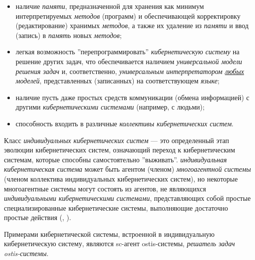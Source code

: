 \begin{itemize}
    \item наличие \textit{памяти}, предназначенной для хранения как минимум интерпретируемых \textit{методов}	(программ)  и обеспечивающей корректировку (редактирование) хранимых \textit{методов}, а также их удаление из	\textit{памяти} и ввод (запись) в \textit{память} новых \textit{методов};
    \item легкая возможность ''перепрограммировать''{} \textit{кибернетическую систему} на решение других задач, что обеспечивается наличием \textit{универсальной модели решения задач} и, соответственно, \textit{универсальным интерпретатором \uline{любых} моделей}, представленных (записанных) на соответствующем \textit{языке};
    \item наличие пусть даже простых средств коммуникации (обмена информацией) с другими \textit{кибернетическими системами} (например, с людьми);
    \item способность входить в различные \textit{коллективы кибернетических систем}.
\end{itemize}

Класс \textit{индивидуальных кибернетических систем} — это определенный этап эволюции кибернетических систем, означающий переход к кибернетическим системам, которые способны самостоятельно ''выживать''. \textit{индивидуальная кибернетическая система} может быть агентом (членом) \textit{многоагентной системы} (членом коллектива индивидуальных кибернетических систем), но некоторые многоагентные системы могут состоять из агентов, не являющихся \textit{индивидуальными кибернетическими системами}, представляющих собой простые специализированные кибернетические системы, выполняющие достаточно простые действия (, ).

Примерами кибернетической системы, встроенной в индивидуальную кибернетическую систему, являются sc-агент ostis-системы, \textit{решатель задач ostis-системы}.

